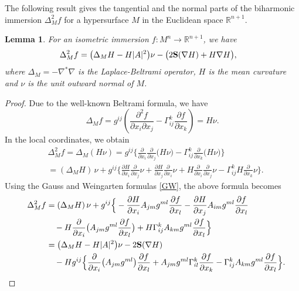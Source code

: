 \documentclass{amsart}
\newtheorem{lemma}[theorem]{Lemma}
\theoremstyle{definition}
\numberwithin{equation}{section}
\begin{document}
The following result gives the tangential and the normal parts of the
biharmonic immersion $\Delta_{M}^2 f$ for a hypersurface $M$ in the
Euclidean space $\mathbb R^{n+1}$.
\begin{lemma} \label{bp}
For an isometric immersion $f: M^n \rightarrow \mathbb{R}^{n+1}$,
we have
\begin{align}
\Delta_{M}^2 f&=\big(\Delta_{M}
H-H\vert A\vert ^2\big)\nu-\big(2{\bf S}(\nabla
  H)+H\nabla H\big),\nonumber
\end{align}
where $\Delta_{M}=-\nabla^*\nabla $ is  the Laplace-Beltrami
operator,  $H$ is the mean curvature and  $\nu$ is the unit outward  normal of $M$.
\end{lemma}
\begin{proof}Due to the well-known Beltrami  formula, we have
\[\Delta_{M}f=g^{ij}\left ( \frac{\partial^2 f}{\partial x_i \partial
    x_j}-\Gamma_{ij}^k\frac{\partial f}{\partial x_k}\right ) =H\nu.\]
In the local coordinates,
we obtain
\begin{align}
&\Delta_{M}^2 f= \Delta_{M}(H\nu )  =g^{ij}\Big\{\frac{\partial}{\partial x_i}\frac{\partial}{\partial
x_j}\big(H\nu\big)- \Gamma_{ij}^k\frac{\partial}{\partial
x_k}\big(H\nu\big) \Big\} \nonumber\\
& = (\Delta_{M} H)\, \nu +g^{ij}\Big\{\frac{\partial H}{\partial x_i}\frac{\partial}{\partial
	x_j}\nu+\frac{\partial H}{\partial x_j}\frac{\partial}{\partial
	x_i}\nu+H\frac{\partial}{\partial x_i}\frac{\partial}{\partial
x_j}\nu  -\Gamma_{ij}^k
H\frac{\partial}{\partial x_k}\nu  \Big\}. \nonumber
\end{align}
Using
the Gauss and Weingarten formulas \eqref{GW}, the above formula becomes
\begin{align}\label{Delta:1}
\quad \Delta_{M}^2f&=(\Delta_{M} H)\, \nu +g^{ij}\Big\{-\frac{\partial H}{\partial x_i}A_{jm}g^{ml}\frac{\partial f}{\partial x_l}-\frac{\partial
H}{\partial x_j}A_{im}g^{ml}\frac{\partial f}{\partial x_l}\\
&\quad-H\frac{\partial}{\partial
	x_i}\big(A_{jm}g^{ml}\frac{\partial f}{\partial
	x_l}\big)+H\Gamma_{ij}^k A_{km}g^{ml}\frac{\partial f}{\partial x_l}
\Big\}\nonumber \\
&=\big(\Delta_{M} H-H\vert A\vert ^2\big)\nu-2{\bf S}(\nabla H)\nonumber\\
&\quad-Hg^{ij}\Big\{\frac{\partial}{\partial
x_i}\big(A_{jm}g^{ml}\big)\frac{\partial f}{\partial
x_l}+A_{jm}g^{ml}\Gamma_{il}^k\frac{\partial f}{\partial
x_k}-\Gamma_{ij}^k A_{km}g^{ml}\frac{\partial f}{\partial x_l}
\Big\}\nonumber.

\end{align}
\end{proof}
\end{document}
